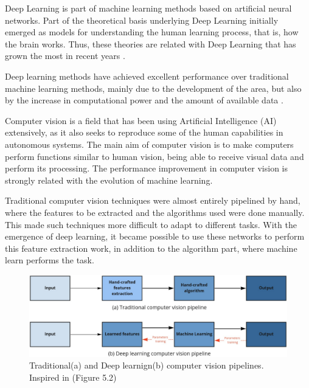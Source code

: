  Deep Learning is part of machine learning methods based on artificial neural networks. %
 Part of the theoretical basis underlying Deep Learning  initially emerged as models for understanding the human learning process, that is, how the brain works. Thus, these theories are related with Deep Learning  that has grown the most in recent years \cite{goodfellow2016}.

Deep learning methods have achieved excellent performance over traditional machine learning methods, mainly due to the development of the area, but also by the increase in computational power and the amount of available data \cite{geron2019}. 

Computer vision is a field that has been using Artificial Intelligence (AI) extensively, as it also seeks to reproduce some of the human capabilities in autonomous systems. The main aim of computer vision is to make computers perform functions similar to human vision, being able to receive visual data and perform its processing. The performance improvement in computer vision is strongly related with the evolution of machine learning.

Traditional computer vision techniques were almost entirely pipelined by hand, where the features to be extracted and the algorithms used were done manually. This made such techniques more difficult to adapt to different tasks. With the emergence of deep learning, it became possible to use these networks to perform this feature extraction work, in addition to the algorithm part, where machine learn performs the task.

\begin{figure}
    \centering
    \includegraphics[scale=0.20]{Part 3 - Learning Systems/Supervised Learning/Deep Learning/images/cvpipeline.png}
    \caption{Traditional(a) and Deep learnign(b) computer vision pipelines. Inspired in \cite{szeliski2010computer}(Figure 5.2)}
    \label{fig:figurecvpipeline}
\end{figure}

